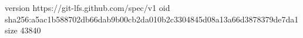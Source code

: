 version https://git-lfs.github.com/spec/v1
oid sha256:a5ac1b588702db66dab9b00cb2da010b2c3304845d08a13a66d3878379de7da1
size 43840
